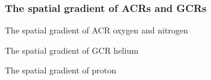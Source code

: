 \subsubsection*{The spatial gradient of ACRs and GCRs}
The spatial gradient of ACR oxygen and nitrogen


The spatial gradient of GCR helium


The spatial gradient of proton



